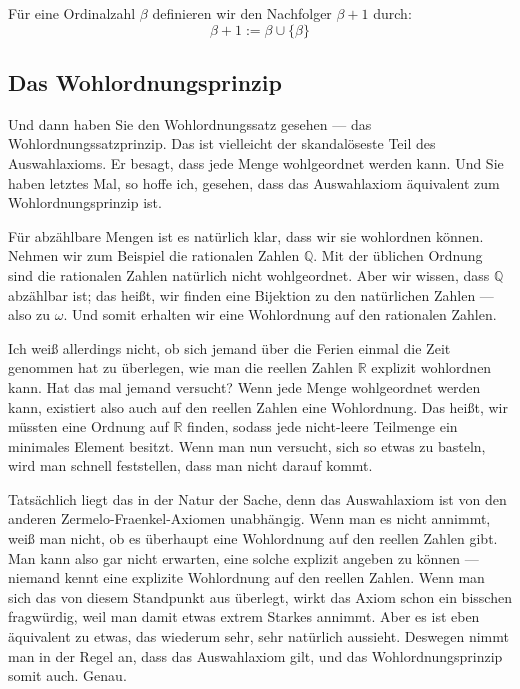 \begin{math-stroke}
Für eine Ordinalzahl $\beta$ definieren wir den Nachfolger $\beta + 1$ durch:
\[
\beta + 1 := \beta \cup \{\beta\}
\]
\end{math-stroke}

\subsection{Das Wohlordnungsprinzip}

\begin{spoken-clean}[00:17:11 - 00:19:17]
Und dann haben Sie den Wohlordnungssatz gesehen --- das Wohlordnungssatzprinzip. Das ist vielleicht der skandalöseste Teil des Auswahlaxioms. Er besagt, dass jede Menge wohlgeordnet werden kann. Und Sie haben letztes Mal, so hoffe ich, gesehen, dass das Auswahlaxiom äquivalent zum Wohlordnungsprinzip ist.

Für abzählbare Mengen ist es natürlich klar, dass wir sie wohlordnen können. Nehmen wir zum Beispiel die rationalen Zahlen $\mathbb{Q}$. Mit der üblichen Ordnung sind die rationalen Zahlen natürlich nicht wohlgeordnet. Aber wir wissen, dass $\mathbb{Q}$ abzählbar ist; das heißt, wir finden eine Bijektion zu den natürlichen Zahlen --- also zu $\omega$. Und somit erhalten wir eine Wohlordnung auf den rationalen Zahlen.

Ich weiß allerdings nicht, ob sich jemand über die Ferien einmal die Zeit genommen hat zu überlegen, wie man die reellen Zahlen $\mathbb{R}$ explizit wohlordnen kann. Hat das mal jemand versucht? Wenn jede Menge wohlgeordnet werden kann, existiert also auch auf den reellen Zahlen eine Wohlordnung. Das heißt, wir müssten eine Ordnung auf $\mathbb{R}$ finden, sodass jede nicht-leere Teilmenge ein minimales Element besitzt. Wenn man nun versucht, sich so etwas zu basteln, wird man schnell feststellen, dass man nicht darauf kommt.

Tatsächlich liegt das in der Natur der Sache, denn das Auswahlaxiom ist von den anderen Zermelo-Fraenkel-Axiomen unabhängig. Wenn man es nicht annimmt, weiß man nicht, ob es überhaupt eine Wohlordnung auf den reellen Zahlen gibt. Man kann also gar nicht erwarten, eine solche explizit angeben zu können --- niemand kennt eine explizite Wohlordnung auf den reellen Zahlen. Wenn man sich das von diesem Standpunkt aus überlegt, wirkt das Axiom schon ein bisschen fragwürdig, weil man damit etwas extrem Starkes annimmt. Aber es ist eben äquivalent zu etwas, das wiederum sehr, sehr natürlich aussieht. Deswegen nimmt man in der Regel an, dass das Auswahlaxiom gilt, und das Wohlordnungsprinzip somit auch. Genau.
\end{spoken-clean}


